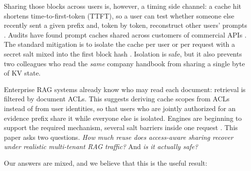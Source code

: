 \documentclass[11pt]{article}
\begin{document}
Sharing those blocks across users is, however, a timing side channel: a cache hit shortens time-to-first-token (TTFT), so a user can test whether someone else recently sent a given prefix and, token by token, reconstruct other users' prompts \citep{wu2025promptpeek,zheng2024inputsnatch,song2024earlybird}. Audits have found prompt caches shared across customers of commercial APIs \citep{gu2025audit}. The standard mitigation is to isolate the cache per user or per request with a secret salt mixed into the first block hash \citep{vllm2026security,addagada2026kvgov}. Isolation is safe, but it also prevents two colleagues who read the \emph{same} company handbook from sharing a single byte of KV state.

Enterprise RAG systems already know who may read each document: retrieval is filtered by document ACLs. This suggests deriving cache scopes from ACLs instead of from user identities, so that users who are jointly authorized for an evidence prefix share it while everyone else is isolated. Engines are beginning to support the required mechanism, several salt barriers inside one request \citep{vllm2025rfc,vllm2026saltregions}. This paper asks two questions. \emph{How much reuse does access-aware sharing recover under realistic multi-tenant RAG traffic?} And \emph{is it actually safe?}

Our answers are mixed, and we believe that this is the useful result:
\end{document}
